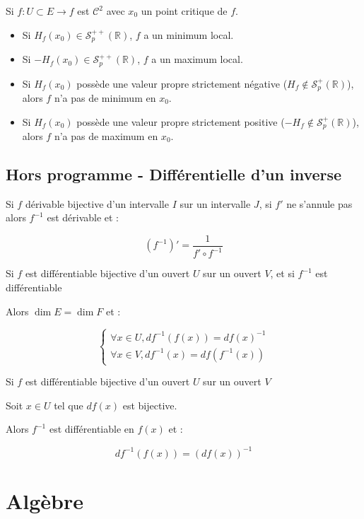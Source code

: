 \documentclass[a4paper,12pt]{book}
\newcommand{\Thr}[2]{\begin{tcolorbox}[sharp corners, colback=white,colframe=red!10!blue!30!green!75!, title=Théorème : #1]#2\end{tcolorbox}}
\def\R{\mathbb{R}}
\begin{document}
\Thr{Interprétation de la Hessienne}{Si $f:U\subset E\to f$ est $\mathcal{C}^2$ avec $x_0$ un point critique de $f$.\begin{itemize}
\item Si $H_f(x_0)\in\mathcal{S}_p^{++}(\R)$, $f$ a un minimum local.
\item Si $-H_f(x_0)\in\mathcal{S}_p^{++}(\R)$, $f$ a un maximum local.
\item Si $H_f(x_0)$ possède une valeur propre strictement négative ($H_f\notin\mathcal{S}_p^+(\R)$), alors $f$ n'a pas de minimum en $x_0$.
\item Si $H_f(x_0)$ possède une valeur propre strictement positive ($-H_f\notin\mathcal{S}_p^+(\R)$), alors $f$ n'a pas de maximum en $x_0$.
\end{itemize}}


\subsection{Hors programme - Différentielle d'un inverse}
\Thr{Dans R}{Si $f$ dérivable bijective d'un intervalle $I$ sur un intervalle $J$, si $f'$ ne s'annule pas alors $f^{-1}$ est dérivable et :
\par $$(f^{-1})' = \dfrac{1}{f'\circ f^{-1}}$$}
\Thr{Dans le cas général}{Si $f$ est différentiable bijective d'un ouvert $U$ sur un ouvert $V$, et si $f^{-1}$ est différentiable
\par Alors $\dim E=\dim F$ et :
\par $$\begin{cases}\forall x\in U, df^{-1}(f(x)) = df(x)^{-1} \\ \forall x\in V, df^{-1}(x) = df(f^{-1}(x))\end{cases}$$}
\Thr{}{Si $f$ est différentiable bijective d'un ouvert $U$ sur un ouvert $V$
\par Soit $x\in U$ tel que $df(x)$ est bijective.
\par Alors $f^{-1}$ est différentiable en $f(x)$ et :
\par $$df^{-1}(f(x)) = (df(x))^{-1}$$}


\newpage
\section{Algèbre}
\end{document}
